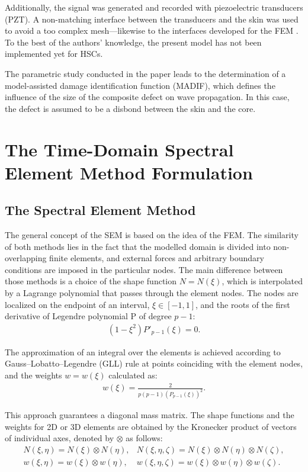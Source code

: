 \documentclass[sensors,article,accept,moreauthors,pdftex]{Definitions/mdpi}
\begin{document}
Additionally, the signal was generated and recorded with piezoelectric transducers (PZT).
A non-matching interface between the transducers and the skin was used to avoid a too complex mesh---likewise to the interfaces developed for the FEM \cite{flemisch2000elasto, flemisch2012non}. 
To the best of the authors’ knowledge, the present model has not been implemented yet for  HSCs.

The parametric study conducted in the paper leads to the determination of a model-assisted damage identification function (MADIF), which defines the influence of the size of the composite defect on wave propagation.
In this case, the defect is assumed to be a disbond between the skin and the core.

\section{The Time-Domain Spectral Element Method Formulation}
\label{sec:time_SEM}
\subsection{The Spectral Element Method}
\label{sec:sem}
The general concept of the SEM is based on the idea of the FEM.
The similarity of both methods lies in the fact that the modelled domain is divided into non-overlapping finite elements, and external forces and arbitrary boundary conditions are imposed in the particular nodes.
The main difference between those methods is a choice of the shape function \( N=N(\xi )\), which is interpolated by a Lagrange polynomial that passes through the element nodes. The nodes are localized on the endpoint of an interval, \(\xi\in[-1,1]\), and the roots of the first derivative of Legendre polynomial P of degree \(p-1\):
\begin{eqnarray}
(1-\xi^2)P'_{p-1}(\xi)=0.
\label{eq:nodes}
\end{eqnarray}

The approximation of an integral over the elements is achieved according to Gauss--Lobatto--Legendre (GLL) rule at points coinciding with the element nodes, 
and the weights \(w=w(\xi)\) calculated as:
\begin{eqnarray}
{w(\xi)} = \frac{2}{p(p-1)(P_{p-1}(\xi))^2}.
\label{eq:weights}
\end{eqnarray}

This approach guarantees a diagonal mass matrix.
The shape functions and the weights for 2D or 3D elements are obtained by the Kronecker product of vectors of individual axes, denoted by \(\otimes\) as follows:
\begin{eqnarray}
N(\xi,\eta) = N(\xi)\otimes N(\eta), & N(\xi,\eta,\zeta) = N(\xi)\otimes N(\eta)\otimes N(\zeta), \nonumber\\
w(\xi,\eta) = w(\xi)\otimes w(\eta), & w(\xi,\eta,\zeta) = w(\xi)\otimes w(\eta)\otimes w(\zeta).
\label{eq:3Dshape_weights}
\end{eqnarray}
\end{document}
